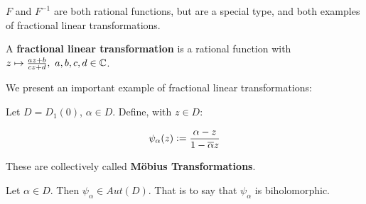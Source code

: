 $F$ and $F^{-1}$ are both rational functions, but are a special type, and both examples of fractional linear transformations.


\begin{definition}
A \textbf{fractional linear transformation} is a rational function with $z \mapsto \frac{az+b}{cz+d}, \, \, a,b,c,d \in \mathbb{C}$.
\end{definition}

We present an important example of fractional linear transformations:


\begin{definition}

Let $D = D_1(0)$, $\alpha \in D$. Define, with $z \in D$:

\begin{align*}
    \psi_\alpha (z) \vcentcolon = \frac{\alpha -z}{1 - \overline{\alpha} z}
\end{align*}

These are collectively called \textbf{M{\"o}bius Transformations}.
\end{definition}
\begin{proposition}
Let $ \alpha \in D$. Then $\psi_\alpha \in Aut (D)$. That is to say that $\psi_\alpha$ is biholomorphic.
\end{proposition}


